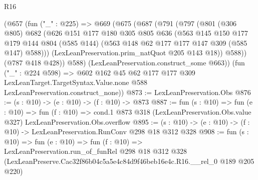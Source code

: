 \begin{lexlean}{R16}
\begin{coremodule}
    (@657
      (fun ("_" : @225) =>
      @669
        (@675
          (@687
            (@791
              (@797
                (@801
                  (@306 @805)
                  @682
                  (@626
                    @151
                    @177
                    @180
                    @305
                    @805
                    @636
                    (@563
                      @145
                      @150
                      @177
                      @179
                      @144
                      @804
                      (@585 @144)
                      (@563 @148 @62 @177 @177 @147 @309 (@585 @147) @588)))
                  (LexLeanPreservation.prim_natQuot @205 @143 @18))
                @588))
            (@787 @418 @428))
          @588)
        (LexLeanPreservation.construct_some @663))
      (fun ("_" : @224 @598) =>
      @602
        @162
        @45
        @62
        @177
        @177
        @309
        LexLeanTarget.TargetSyntax.Value.none
        @588
        LexLeanPreservation.construct_none))
@873 := LexLeanPreservation.Obs
@876 := (s : @10) -> (e : @10) -> (f : @10) -> @873
@887 := fun (s : @10) =>
  fun (e : @10) =>
  fun (f : @10) =>
  cond.{1} @873 @318 (LexLeanPreservation.Obs.value @327) LexLeanPreservation.Obs.overflow
@895 := (s : @10) -> (e : @10) -> (f : @10) -> LexLeanPreservation.RunConv @298 @18 @312 @328
@908 := fun (s : @10) =>
  fun (e : @10) =>
  fun (f : @10) =>
  LexLeanPreservation.run_of_funRel
    @298
    @18
    @312
    @328
    (LexLeanPreserve.Cac32f86b04c5a5e4c84d9f46beb16e4c.R16.__rel_0 @189 @205 @220)
\end{coremodule}
\end{lexlean}
